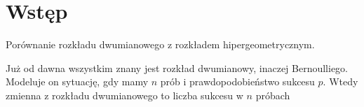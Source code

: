 \documentclass[twoside,a4paper]{book}
\begin{document}
	
\chapter{Wstęp}
Porównanie rozkładu dwumianowego z rozkładem hipergeometrycznym.

Już od dawna wszystkim znany jest rozkład dwumianowy, inaczej Bernoulliego. Modeluje on sytuację, gdy mamy $n$ prób i prawdopodobieństwo sukcesu $p$. Wtedy zmienna z rozkładu dwumianowego to liczba sukcesu w $n$ próbach 



\end{document}
